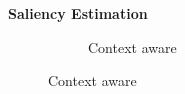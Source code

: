 \begin{frame}{\textbf{Saliency Estimation}}
\begin{figure}
{\begin{minipage}{.45\textwidth}
\begin{subfigure}[c]{\textwidth}
			\caption{Context aware}
		\end{subfigure}
	\end{minipage}}
\end{figure}
\end{frame}

